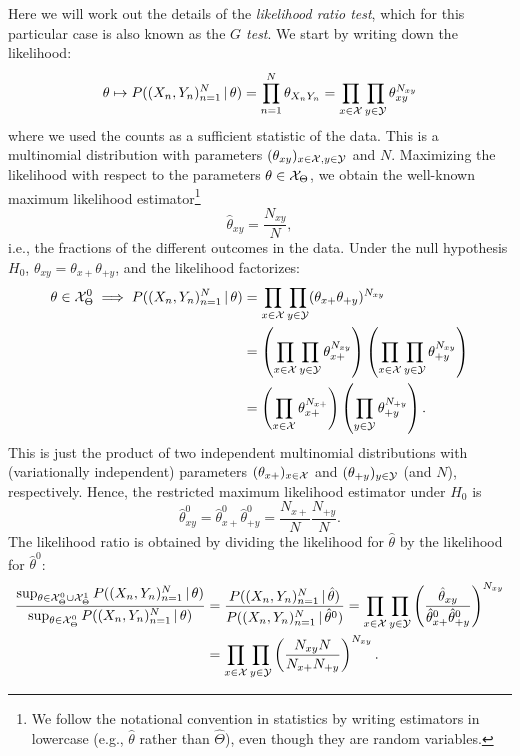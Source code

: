 Here we will work out the details of the \emph{likelihood ratio test}, which for this particular case
is also known as the \emph{$G$ test}. We start by writing down the likelihood:
$$\theta \mapsto P((X_n,Y_n)_{n=1}^N \operatorname*{|} \theta) = \prod_{n=1}^N \theta_{X_nY_n} = \prod_{x\in\mathcal{X}} \prod_{y\in\mathcal{Y}} \theta_{xy}^{N_{xy}}$$
where we used the counts as a sufficient statistic of the data. 
This is a multinomial distribution with parameters $(\theta_{xy})_{x\in\mathcal{X},y\in\mathcal{Y}}$ and $N$.
Maximizing the likelihood with respect to the parameters $\theta \in \mathcal{X}_\Theta$, we obtain the well-known maximum likelihood estimator\footnote{We follow the notational convention in statistics by writing estimators in lowercase (e.g., $\hat \theta$ rather than $\hat \Theta$), even though they are random variables.}
$$\hat \theta_{xy} = \frac{N_{xy}}{N},$$
i.e., the fractions of the different outcomes in the data.
Under the null hypothesis $H_0$, $\theta_{xy} = \theta_{x+}\theta_{+ y}$, and the likelihood factorizes:
\begin{equation*}\begin{split}
  \theta \in \mathcal{X}_\Theta^0 \implies P((X_n,Y_n)_{n=1}^N \operatorname*{|} \theta) 
  &= \prod_{x\in\mathcal{X}} \prod_{y\in\mathcal{Y}} (\theta_{x+} \theta_{+ y})^{N_{xy}} \\
  &= \left(\prod_{x\in\mathcal{X}} \prod_{y\in\mathcal{Y}} \theta_{x+}^{N_{xy}} \right) \left(\prod_{x\in\mathcal{X}} \prod_{y\in\mathcal{Y}} \theta_{+ y}^{N_{xy}}\right) \\
  &= \left(\prod_{x\in\mathcal{X}} \theta_{x+}^{N_{x+}} \right) \left(\prod_{y\in\mathcal{Y}} \theta_{+ y}^{N_{+ y}}\right).
\end{split}\end{equation*}
This is just the product of two independent multinomial distributions with (variationally independent) parameters
$(\theta_{x+})_{x\in\mathcal{X}}$ and $(\theta_{+ y})_{y\in\mathcal{Y}}$ (and $N$), respectively.
Hence, the restricted maximum likelihood estimator under $H_0$ is 
$$\hat \theta^0_{xy} = \hat \theta^0_{x+} \hat \theta^0_{+ y} = \frac{N_{x+}}{N} \frac{N_{+ y}}{N}.$$
The likelihood ratio is obtained by dividing the likelihood for $\hat \theta$ by the likelihood for $\hat \theta^0$:
\begin{equation}\label{eq:indep_test_XY_likelihood_ratio}\begin{split}
\frac{\sup_{\theta\in\mathcal{X}_\Theta^0\cup\mathcal{X}_\Theta^1} P((X_n,Y_n)_{n=1}^N \operatorname*{|} \theta)}{\sup_{\theta\in\mathcal{X}_\Theta^0} P((X_n,Y_n)_{n=1}^N \operatorname*{|} \theta)}
  & = \frac{P((X_n,Y_n)_{n=1}^N \operatorname*{|} \hat\theta)}{P((X_n,Y_n)_{n=1}^N \operatorname*{|} \hat\theta^0)}
    = \prod_{x\in\mathcal{X}} \prod_{y\in\mathcal{Y}} \left(\frac{\hat \theta_{xy}}{\hat \theta^0_{x+} \hat \theta^0_{+ y}}\right)^{N_{xy}} \\
  & = \prod_{x\in\mathcal{X}} \prod_{y\in\mathcal{Y}} \left(\frac{N_{xy} N}{N_{x+} N_{+ y}}\right)^{N_{xy}}.
\end{split}\end{equation}
